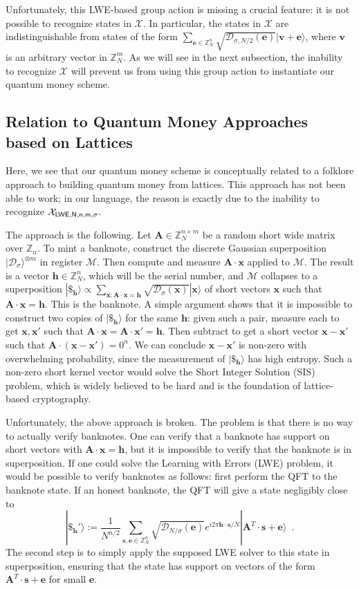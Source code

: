 \documentclass{article}\usepackage[a4paper,margin=20mm]{geometry}
\numberwithin{theorem}{section}
\numberwithin{equation}{section}
\newcommand{\Z}{\mathbb{Z}}
\newcommand{\ev}{{\mathbf{e}}}
\newcommand{\hv}{{\mathbf{h}}}
\newcommand{\sv}{{\mathbf{s}}}
\providecommand{\vv}{}\renewcommand{\vv}{{\mathbf{v}}}
\newcommand{\xv}{{\mathbf{x}}}
\newcommand{\Am}{{\mathbf{A}}}
\newcommand{\Ds}{{\mathcal{D}}}
\newcommand{\Ms}{{\mathcal{M}}}
\newcommand{\Xs}{{\mathcal{X}}}
\begin{document}
Unfortunately, this LWE-based group action is missing a crucial feature: it is not possible to recognize states in $\Xs$. In particular, the states in $\Xs$ are indistinguishable from states of the form $\sum_{\ev\in\Z_N^n}\sqrt{\Ds_{\sigma,N/2}(\ev)}|\vv+\ev\rangle$, where $\vv$ is an arbitrary vector in $\Z_N^m$. As we will see in the next subsection, the inability to recognize $\Xs$ will prevent us from using this group action to instantiate our quantum money scheme.



\subsection{Relation to Quantum Money Approaches based on Lattices}

Here, we see that our quantum money scheme is conceptually related to a folklore approach to building quantum money from lattices. This approach has not been able to work; in our language, the reason is exactly due to the inability to recognize $\Xs_{\sf LWE,N,n,m,\sigma}$. 

The approach is the following. Let $\Am\in\Z_N^{n\times m}$ be a random short wide matrix over $\Z_n$. To mint a banknote, construct the discrete Gaussian superposition $|\Ds_\sigma\rangle^{\otimes m}$ in register $\Ms$. Then compute and measure $\Am\cdot \xv$ applied to $\Ms$. The result is a vector $\hv\in\Z_N^n$, which will be the serial number, and $\Ms$ collapses to a superposition $|\$_\hv\rangle\propto \sum_{\xv:\Am\cdot\xv=\hv} \sqrt{\Ds_\sigma(\xv)}|\xv\rangle$ of short vectors $\xv$ such that $\Am\cdot\xv=\hv$. This is the banknote. A simple argument shows that it is impossible to construct two copies of $|\$_\hv\rangle$ for the same $\hv$: given such a pair, measure each to get $\xv,\xv'$ such that $\Am\cdot\xv=\Am\cdot\xv'=\hv$. Then subtract to get a short vector $\xv-\xv'$ such that $\Am\cdot(\xv-\xv')=0^n$. We can conclude $\xv-\xv'$ is non-zero with overwhelming probability, since the measurement of $|\$_\hv\rangle$ has high entropy. Such a non-zero short kernel vector would solve the Short Integer Solution (SIS) problem, which is widely believed to be hard and is the foundation of lattice-based cryptography.

Unfortunately, the above approach is broken. The problem is that there is no way to actually verify banknotes. One can verify that a banknote has support on short vectors with $\Am\cdot\xv=\hv$, but it is impossible to verify that the banknote is in superposition. If one could solve the Learning with Errors (LWE) problem, it would be possible to verify banknotes as follows: first perform the QFT to the banknote state. If an honest banknote, the QFT will give a state negligibly close to
\begin{equation}\label{eqn:banknote}|\$_\hv'\rangle:=\frac{1}{N^{n/2}}\sum_{\sv,\ev\in\Z_N^n}\sqrt{\Ds_{N/\sigma}(\ev)}e^{i2\pi \hv\cdot\sv/N}|\Am^T\cdot\sv+\ev\rangle\enspace .\end{equation}
The second step is to simply apply the supposed LWE solver to this state in superposition, ensuring that the state has support on vectors of the form $\Am^T\cdot\sv+\ev$ for small $\ev$. 
\end{document}
